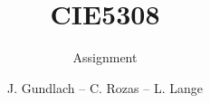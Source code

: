 \documentclass[whitelogo]{tudelft-report}
\begin{document}
\frontmatter


\title[tudelft-white]{CIE5308}
\subtitle[tudelft-black]{Assignment}
\author[tudelft-white]{{J. Gundlach} -- {C. Rozas} -- {L. Lange}}
\makecover[split]




% 

\tableofcontents

\mainmatter




\appendix




\end{document}
